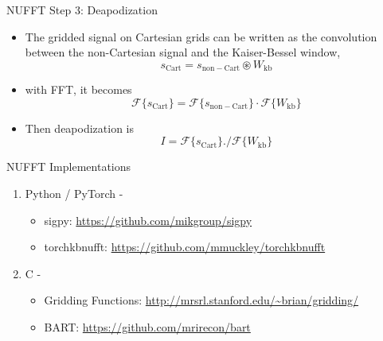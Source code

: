 \begin{frame}{NUFFT Step 3: Deapodization}

	\begin{itemize}
		\item The gridded signal on Cartesian grids can be written as the convolution between the non-Cartesian signal and the Kaiser-Bessel window,
		\begin{equation}
			s_\mathrm{Cart} = s_\mathrm{non-Cart} \circledast W_\mathrm{kb}
		\end{equation}

		\vspace{1em}

		\item with FFT, it becomes
		\begin{equation}
			\mathcal{F} \{s_\mathrm{Cart} \} = \mathcal{F} \{ s_\mathrm{non-Cart} \} \cdot \mathcal{F} \{ W_\mathrm{kb} \}
		\end{equation}

		\vspace{1em}

		\item Then deapodization is
		\begin{equation}
			I = \mathcal{F} \{s_\mathrm{Cart} \} ./ \mathcal{F} \{ W_\mathrm{kb} \}
		\end{equation}

	\end{itemize}

\end{frame}


\begin{frame}{NUFFT Implementations}
    \begin{enumerate}
        \item Python / PyTorch -
        \vspace{1em}
        \begin{itemize}
            \item sigpy: \url{https://github.com/mikgroup/sigpy}
            \vspace{0.5em}
            \item torchkbnufft: \url{https://github.com/mmuckley/torchkbnufft}
        \end{itemize}

        \vspace{2em}
        \item C -
        \vspace{1em}
        \begin{itemize}
            \item Gridding Functions: \url{http://mrsrl.stanford.edu/~brian/gridding/}
            \vspace{0.5em}
            \item BART: \url{https://github.com/mrirecon/bart}
        \end{itemize}
    \end{enumerate}
\end{frame}


